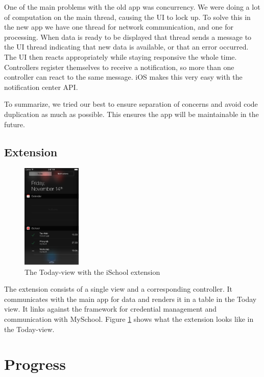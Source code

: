 \documentclass[pdftex, DIV=calc, paper=a4, fontsize=11pt]{scrartcl}	 %
\begin{document}
One of the main problems with the old app was concurrency. We were doing a lot of computation on 
the main thread, causing the UI to lock up. To solve this in the new app we have one thread for 
network communication, and one for processing. When data is ready to be displayed that thread sends
a message to the UI thread indicating that new data is available, or that an error occurred. The UI
then reacts appropriately while staying responsive the whole time. Controllers register themselves 
to receive a notification, so more than one controller can react to the same message. iOS makes this
very easy with the notification center API.

To summarize, we tried our best to ensure separation of concerns and avoid code duplication as much
as possible. This ensures the app will be maintainable in the future.

\subsection{Extension}

\begin{figure}
    \centering
    \includegraphics[width=0.25\textwidth]{widget.png}
    \caption{The Today-view with the iSchool extension}
    \label{fig:today}
\end{figure}

The extension consists of a single view and a corresponding controller. It communicates with the
main app for data and renders it in a table in the Today view. It links against the framework for 
credential management and communication with MySchool. Figure \ref{fig:today} shows what the
extension looks like in the Today-view.


\section{Progress}
\label{sec:progress}
\end{document}

